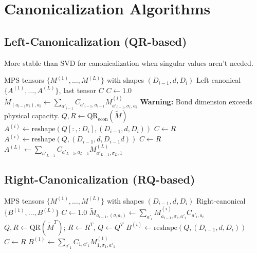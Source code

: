 \documentclass[aps,prb,onecolumn,scriptaddress]{revtex4-2}
\begin{document}
	\clearpage
	\section{Canonicalization Algorithms}
	
	\subsection{Left-Canonicalization (QR-based)}
	More stable than SVD for canonicalization when singular values aren't needed.
	
	\begin{algorithm}[H]
		\caption{LeftCanonicalize (Numerically Stable)}
		\begin{algorithmic}[1]
			\Require MPS tensors $\{M^{(1)}, \dots, M^{(L)}\}$ with shapes $(D_{i-1}, d, D_i)$
			\Ensure Left-canonical $\{A^{(1)}, \dots, A^{(L)}\}$, last tensor $C$
			\State $C \gets 1.0$ 
			\State $\tilde{M}_{(a_{i-1}\sigma_i), a_i} \gets
			\sum_{a'_{i-1}} C_{a'_{i-1}, a_{i-1}} M^{(i)}_{a'_{i-1}, \sigma_i, a_i}$
			\State {}
			\State \textbf{Warning:} Bond dimension exceeds physical capacity.
			\EndIf
			\State $Q, R \gets \text{QR}_{\text{econ}}(\tilde{M})$
			\State $A^{(i)} \gets \text{reshape}(Q[:, :D_i], (D_{i-1}, d, D_i))$
			\State $C \gets R$
			\Else
			\State $A^{(i)} \gets \text{reshape}(Q, (D_{i-1}, d, D_{i-1}d))$
			\State $C \gets R$
			\EndIf
			\EndFor
			\State $A^{(L)} \gets \sum_{a'_{L-1}} C_{a'_{L-1}, a_{L-1}}
			M^{(L)}_{a'_{L-1}, \sigma_L, 1}$
		\end{algorithmic}
	\end{algorithm}
	
	
	\subsection{Right-Canonicalization (RQ-based)}
	
	\begin{algorithm}[H]
		\caption{RightCanonicalize (Numerically Stable)}
		\begin{algorithmic}[1]
			\Require MPS tensors $\{M^{(1)}, \dots, M^{(L)}\}$ with shapes $(D_{i-1}, d, D_i)$
			\Ensure Right-canonical $\{B^{(1)}, \dots, B^{(L)}\}$
			\State $C \gets 1.0$ 
			\State $\tilde{M}_{a_{i-1}, (\sigma_i a_i)} \gets
			\sum_{a'_i} M^{(i)}_{a_{i-1}, \sigma_i, a'_i} C_{a'_i, a_i}$
			\State {}
			\State $Q, R \gets \text{QR}(\tilde{M}^T)$;
			$R \gets R^T$, $Q \gets Q^T$
			\State $B^{(i)} \gets \text{reshape}(Q, (D_{i-1}, d, D_i))$
			\State $C \gets R$
			\EndFor
			\State $B^{(1)} \gets \sum_{a'_1} C_{1, a'_1} M^{(1)}_{1, \sigma_1, a'_1}$
		\end{algorithmic}
	\end{algorithm}
	
\end{document}
